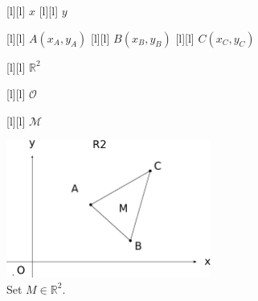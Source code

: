 \begin{figure}[ht]
	\centering
	\footnotesize

	[l] {$x$}
	[l] {$y$}

	[l] {$A(x_A,y_A)$}
	[l] {$B(x_B,y_B)$}
	[l] {$C(x_C,y_C)$}

	[l] {$\mathbb{R}^2$}

	[l] {$\mathcal{O}$}

	[l] {$\mathcal{M}$}

	\includegraphics[width=0.6\textwidth]{setAinR2_Ax.eps}
	\caption{Set $M \in \mathbb{R}^2$.}
	\label{\LABEL}
\end{figure}
